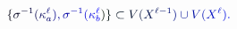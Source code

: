 \documentclass[12pt]{article}
\begin{document}
\makeatletter
\renewcommand*{\@textcolor}[3]{%
  \protect\leavevmode
  \begingroup
    \color#1{#2}#3%
  \endgroup
}
\makeatother
\begin{displaymath}
\mathcolor[RGB]{0,0,15}{\{} \mathcolor[RGB]{0,0,30}{\sigma} ^ { \mathcolor[RGB]{0,0,45}{-} \mathcolor[RGB]{0,0,60}{1} } \mathcolor[RGB]{0,0,75}{(} \mathcolor[RGB]{0,0,90}{\kappa} _ { \mathcolor[RGB]{0,0,105}{a} } ^ { \mathcolor[RGB]{0,0,120}{\ell} } \mathcolor[RGB]{0,0,135}{)} \mathcolor[RGB]{0,0,150}{,} \mathcolor[RGB]{0,0,165}{\sigma} ^ { \mathcolor[RGB]{0,0,180}{-} \mathcolor[RGB]{0,0,195}{1} } \mathcolor[RGB]{0,0,210}{(} \mathcolor[RGB]{0,0,225}{\kappa} _ { \mathcolor[RGB]{0,0,240}{b} } ^ { \mathcolor[RGB]{0,0,255}{\ell} } \mathcolor[RGB]{0,15,0}{)} \mathcolor[RGB]{0,15,15}{\}} \mathcolor[RGB]{0,15,30}{\subset} \mathcolor[RGB]{0,15,45}{V} \mathcolor[RGB]{0,15,60}{(} \mathcolor[RGB]{0,15,75}{X} ^ { \mathcolor[RGB]{0,15,90}{\ell} \mathcolor[RGB]{0,15,105}{-} \mathcolor[RGB]{0,15,120}{1} } \mathcolor[RGB]{0,15,135}{)} \mathcolor[RGB]{0,15,150}{\cup} \mathcolor[RGB]{0,15,165}{V} \mathcolor[RGB]{0,15,180}{(} \mathcolor[RGB]{0,15,195}{X} ^ { \mathcolor[RGB]{0,15,210}{\ell} } \mathcolor[RGB]{0,15,225}{)} \mathcolor[RGB]{0,15,240}{.}
\end{displaymath}
\end{document}
